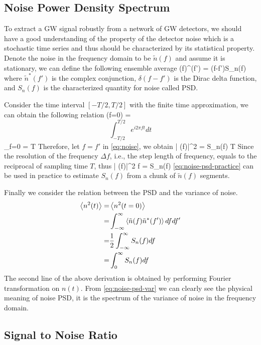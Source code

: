 \subsection{Noise Power Density Spectrum}
To extract a \ac{GW} signal robustly from a network of \ac{GW} detectors, we should have a good understanding of the property of the detector noise which is a stochastic time series and thus should be characterized by its statistical property.
Denote the noise in the frequency domain to be $\tilde{n}(f)$ and assume it is stationary, we can define the following ensemble average
\be \label{eq:noise}
\<(f)^\ast(f')\> = \delta(f-f')S_n(f)
\ee
where $\tilde{n}^\ast(f')$ is the complex conjunction, $\delta(f-f')$ is the Dirac delta function, and $S_n(f)$ is the characterized quantity for noise called \ac{PSD}.

Consider the time interval $[-T/2,T/2]$ with the finite time approximation, we can obtain the following relation
\be 
\delta(f=0) = \[  \int_{-T/2}^{T/2} e^{i2\pi f t } dt \]_{f=0} = T
\ee
Therefore, let $f=f'$ in \cref{eq:noise}, we obtain
\be 
\< |  (f)|^2 \> = S_n(f) T
\ee
Since the resolution of the frequency $\Delta f$, i.e., the step length of frequency, equals to the reciprocal of sampling time $T$, thus
\be\label{eq:noise-psd-practice}
\< |  (f)|^2 \> \Delta f = S_n(f)
\ee
\cref{eq:noise-psd-practice} can be used in practice to estimate $S_n(f)$ from a chunk of $\tilde{n}(f)$ segments.

Finally we consider the relation between the  \ac{PSD} and the variance of noise. 
\begin{align}\label{eq:noise-psd-var}
\left< n^2(t) \right> =& \left< n^2(t=0) \right> \nonumber \\
=& \int_{-\infty}^{\infty} \left<\tilde{n}(f)\tilde{n}^\ast(f')\right> dfdf' \nonumber \\
=& \frac{1}{2} \int_{-\infty}^{\infty} S_n(f) df \nonumber \\
=& \int_0^{\infty} S_n(f) df
\end{align} 
The second line of the above derivation is obtained by performing Fourier transformation on $n(t)$.
From \cref{eq:noise-psd-var} we can clearly see the physical meaning of noise \ac{PSD}, it is the spectrum of the variance of noise in the frequency domain.

\subsection{Signal to Noise Ratio}

